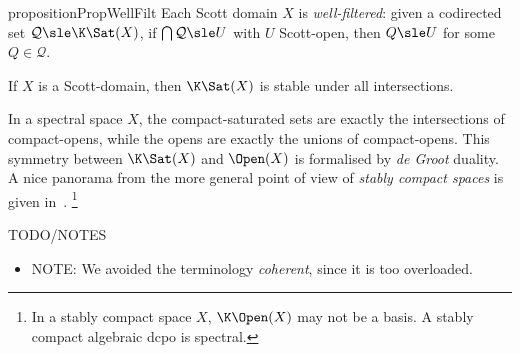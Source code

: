 \begin{restatable}{proposition}{PropWellFilt}
\label{prop:sem:wf}
Each Scott domain $X$ is \emph{well-filtered}:
given a codirected
set $\mathcal{Q} \sle \K\Sat(X)$,
if $\bigcap \mathcal{Q} \sle U$ with $U$ Scott-open,
then $Q \sle U$ for some $Q \in \mathcal{Q}$.
\end{restatable}

\begin{corollary}
\label{cor:sem:ksatbigcap}
If $X$ is a Scott-domain, then $\K\Sat(X)$ is stable under all intersections.
\end{corollary}


\begin{remark}
\label{rem:sem:degroot}
In a spectral space $X$, the compact-saturated sets
are exactly the intersections of compact-opens,
while the opens are exactly the unions of compact-opens.
This symmetry between $\K\Sat(X)$ and $\Open(X)$
is formalised by \emph{de Groot} duality.
A nice panorama from the more general point
of view of \emph{stably compact spaces}
is given in~\cite{lawson11mscs}.%
\footnote{In a stably compact space $X$, $\K\Open(X)$ may not be a basis.
A stably compact algebraic dcpo is spectral.}
\lipicsEnd
\end{remark}


\begin{colinpar}
TODO/NOTES
\begin{itemize}
\item
NOTE: We avoided the terminology \emph{coherent},
since it is too overloaded.
\end{itemize}
\end{colinpar}






